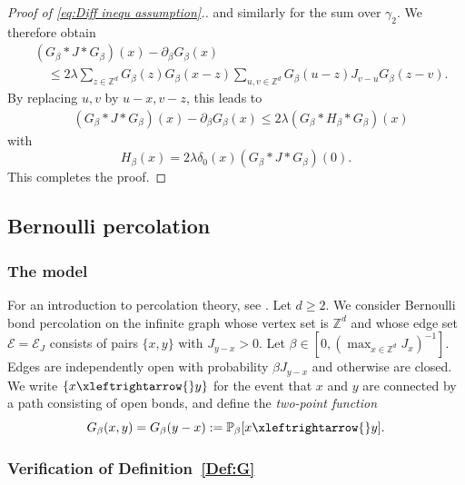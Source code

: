 \documentclass[11pt,a4paper]{article}
\numberwithin{equation}{section}
\theoremstyle{plain}
\theoremstyle{definition}
\newcommand\1{\mathds{1}}
\newcommand{\connect}{\xleftrightarrow}
\begin{document}
\begin{proof}[Proof of \eqref{eq:Diff inequ assumption}.]
and similarly for the sum over $\gamma_2$.  We therefore obtain
\begin{align}
    &(G_\beta * J * G_\beta)(x) - \partial_\beta G_\beta(x)
    \nonumber \\ & \quad \le
    2\lambda     \sum_{z\in \mathbb{Z}^d}
    G_\beta(z)G_\beta(x-z)\sum_{u,v\in \mathbb Z^d}G_\beta(u-z)J_{v-u}G_\beta(z-v).
\end{align}
By replacing $u,v$ by $u-x,v-z$, this leads to
\begin{align}
    &(G_\beta * J * G_\beta)(x) - \partial_\beta G_\beta(x)
    \le
    2\lambda    ( G_\beta*H_\beta*G_\beta)(x)
\end{align}
with
\begin{equation}
\label{eq:HCTWSAW}
    H_\beta(x) = 2\lambda \delta_{0}(x) (G_\beta*J*G_\beta)(0).
\end{equation}
This completes the proof.
\end{proof}


\subsection{Bernoulli percolation}
\label{sec:perc}



\subsubsection{The model}

For an introduction to percolation theory, see \cite{Grim99}.
Let $d \ge 2$.
We consider Bernoulli bond percolation on the infinite graph whose vertex
set is $\mathbb Z^d$ and whose edge set $\mathcal E=\mathcal E_J$ consists of pairs $\{x,y\}$ with
$J_{y-x}>0$.  Let $\beta\in [0,(\max_{x\in \mathbb Z^d} J_x)^{-1}]$.
Edges are independently open with probability $\beta J_{y-x}$
and otherwise are closed.  We write $\{x\connect{}y\}$
for the event that $x$ and $y$ are connected by a path consisting of open bonds,
and define the \emph{two-point function}
 \begin{equation}\label{eq:def 2pt perco}
 	G_\beta(x,y)=G_\beta(y-x):=\mathbb P_\beta[x\connect{}y].
 \end{equation}



\subsubsection{Verification of Definition~\ref{Def:G}}
\end{document}
